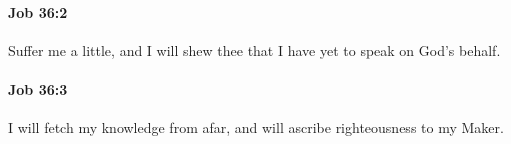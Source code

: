 		\paragraph{Job 36:2} %
			\label{JOB-36-2}

			Suffer me a little, and I will shew thee that I have yet to speak on God’s behalf.


		\paragraph{Job 36:3} %
			\label{JOB-36-3}

			I will fetch my knowledge from afar, and will ascribe righteousness to my Maker.



